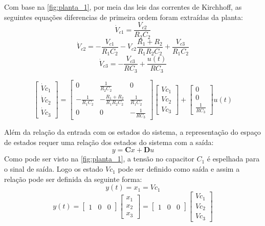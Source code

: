 \documentclass[
	article,			%
	11pt,				%
	oneside,			%
	a4paper,			%
	english,			%
	brazil,				%
	sumario=tradicional
	]{abntex2}
\begin{document}
Com base na \autoref{fig:planta_1}, por meia das leis das correntes de Kirchhoff, as seguintes equações diferencias de primeira ordem foram extraídas da planta:
$$
	\dot V_{c1} = \frac{V_{c2}}{R_2C_2}
$$
$$
	\dot V_{c2} = -\frac{V_{c1}}{R_1C_2}-V_{c2}\frac{R_1+R_2}{R_1R_2C_2}+\frac{V_{c3}}{R_1C_2}
$$
$$
	\dot V_{c3} = -\frac{V_{c3}}{RC_3}+\frac{u(t)}{RC_3}
$$

$$
\left[
\begin{array}{ccc}
\dot Vc_1 \\
\dot Vc_2 \\
\dot Vc_3
\end{array}
\right]
 = 
\left[
\begin{array}{ccc}
0 & \frac{1}{R_2C_2} & 0 \\
-\frac{1}{R_1C_2} & -\frac{R_1+R_2}{R_1R_2C_2} &\frac{1}{R_1C_2} \\
0 & 0 & -\frac{1}{RC_3}
\end{array}
\right]
\left[
\begin{array}{ccc}
Vc_1\\
Vc_2\\
Vc_3
\end{array}
\right]
+
\left[
\begin{array}{ccc}
0 \\
0 \\
\frac{1}{RC_3}
\end{array}
\right]
u(t)
$$

\pagebreak

Além da relação da entrada com os estados do sistema, a representação do espaço de estados requer uma relação dos estados do sistema com a saída:
$$
y = \textbf{C}x + \textbf{D}u
$$
Como pode ser visto na \autoref{fig:planta_1}, a tensão no capacitor $C_1$ é espelhada para o sinal de saída. 
Logo os estado $Vc_1$ pode ser definido como saída e assim a relação pode ser definida da seguinte forma:
$$
y(t)=x_1=Vc_1
$$
$$
y(t)
=
\left[
\begin{array}{ccc}
1 & 0 & 0
\end{array}
\right]
\left[
\begin{array}{ccc}
x_1\\
x_2\\
x_3
\end{array}
\right]
=
\left[
\begin{array}{ccc}
1 & 0 & 0
\end{array}
\right]
\left[
\begin{array}{ccc}
Vc_1\\
Vc_2\\
Vc_3
\end{array}
\right]
$$
\end{document}
